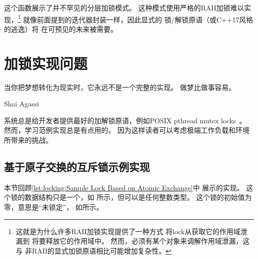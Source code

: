 
这个函数展示了并不罕见的分层加锁模式。
这种模式使用严格的RAII加锁难以实现，\footnote{
	这就是为什么许多RAII加锁实现提供了一种方式
	将lock从获取它的作用域泄漏到
	将要释放它的作用域中。
	然而，必须有某个对象来调解作用域泄漏，这与
	非RAII的显式加锁原语相比可能增加复杂性。}
就像前面提到的迭代器封装一样，因此显式的
锁/解锁原语（或C++17风格的逃逸）将
在可预见的未来被需要。

\section{加锁实现问题}
\label{sec:locking:Locking Implementation Issues}
%
\epigraph{当你把梦想转化为现实时，它永远不是一个完整的实现。
	  做梦比做事容易。}
	 {Shai Agassi}

系统总是给开发者提供最好的加解锁原语，例如POSIX
pthread mutex locks~\cite{OpenGroup1997pthreads,Butenhof1997pthreads}。
然而，学习范例实现总是有点用的，
因为这样读者可以考虑极端工作负载和环境所带来的挑战。

\subsection{基于原子交换的互斥锁示例实现}
\label{sec:locking:Sample Exclusive-Locking Implementation Based on Atomic Exchange}

\begin{fcvref}
本节回顾\cref{lst:locking:Sample Lock Based on Atomic Exchange}中
展示的实现。
这个锁的数据结构只是一个，如
所示，但可以是任何整数类型。
这个锁的初始值为零，意思是``未锁定''，
如所示。
\end{fcvref}

